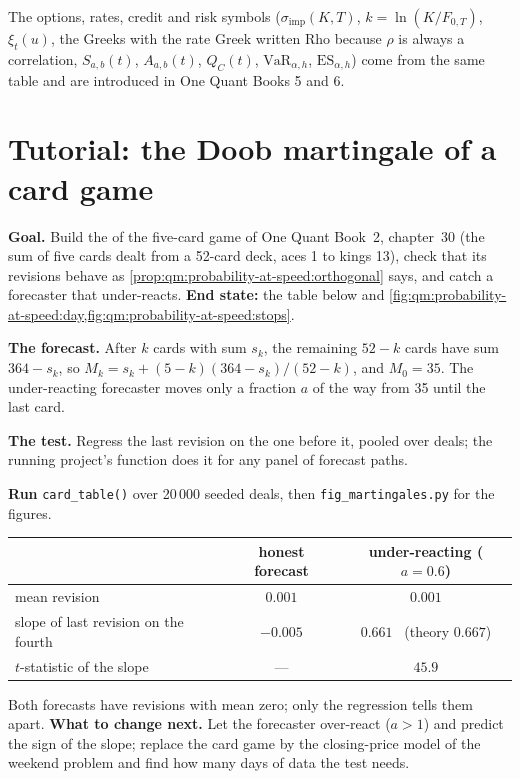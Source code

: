 The options, rates, credit and risk symbols ($\sigma_{\mathrm{imp}}(K,T)$, $k = \ln(K/F_{0,T})$,
$\xi_t(u)$, the Greeks with the rate Greek written Rho because $\rho$ is always a correlation,
$S_{a,b}(t)$, $A_{a,b}(t)$, $Q_C(t)$, $\mathrm{VaR}_{\alpha,h}$, $\mathrm{ES}_{\alpha,h}$) come
from the same table and are introduced in One Quant Books 5 and 6.

\section{Tutorial: the Doob martingale of a card game}\label{tut:qm:probability-at-speed:cards}

\begin{tutorial}
\textbf{Goal.} Build the  of the five-card game of One Quant Book~2,
chapter~30 (the sum of five cards dealt from a 52-card deck, aces 1 to kings 13), check that
its revisions behave as \cref{prop:qm:probability-at-speed:orthogonal} says, and catch a
forecaster that under-reacts. \textbf{End state:} the table below and
\cref{fig:qm:probability-at-speed:day,fig:qm:probability-at-speed:stops}.
\begin{tutsteps}
\item \textbf{The forecast.} After $k$ cards with sum $s_k$, the remaining $52 - k$ cards
have sum $364 - s_k$, so $M_k = s_k + (5 - k)(364 - s_k)/(52 - k)$, and $M_0 = 35$. The
under-reacting forecaster moves only a fraction $a$ of the way from 35 until the last card.
\label{lst:qm:probability-at-speed:cards}
\item \textbf{The test.} Regress the last revision on the one before it, pooled over deals;
the running project's function does it for any panel of forecast paths.
\label{lst:qm:probability-at-speed:regression}
\item \textbf{Run} \texttt{card\_table()} over 20\,000 seeded deals, then
\texttt{fig\_martingales.py} for the figures.
\end{tutsteps}
\begin{center}
\small
\begin{tabular}{@{}lcc@{}}
\toprule
 & honest forecast & under-reacting ($a = 0.6$) \\
\midrule
mean revision & $0.001$ & $0.001$ \\
slope of last revision on the fourth & $-0.005$ & $0.661$ \ (theory $0.667$) \\
$t$-statistic of the slope & --- & $45.9$ \\
\bottomrule
\end{tabular}
\end{center}
Both forecasts have revisions with mean zero; only the regression tells them apart.
\textbf{What to change next.} Let the forecaster over-react ($a > 1$) and predict the sign of
the slope; replace the card game by the closing-price model of the weekend problem and find
how many days of data the test needs.
\end{tutorial}


